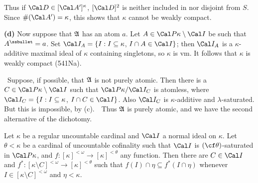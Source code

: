 {Thus if $\Cal D\in[\Cal A']^{\kappa}$, $[\Cal D]^2$ is neither included
in nor disjoint from $S$.   Since $\#(\Cal A')=\kappa$, this shows that
$\kappa$ cannot be weakly compact.\ \Qed

\medskip

{\bf (d)} Now suppose that $\frak A$ has an atom $a$.
Let $A\in\Cal P\kappa\setminus\Cal I$ be such that $A^{\ssbullet}=a$.
Set $\Cal I_A=\{I:I\subseteq\kappa$, $I\cap A\in\Cal I\}$;  then
$\Cal I_A$ is a $\kappa$-additive maximal ideal of $\kappa$ containing
singletons, so $\kappa$ is \2vm.   It follows that $\kappa$ is weakly
compact (541Na).

\Quer\ Suppose, if possible, that $\frak A$ is not purely atomic.   Then
there is a $C\in\Cal P\kappa\setminus\Cal I$ such that
$\Cal P\kappa/\Cal I_C$ is atomless, where
$\Cal I_C=\{I:I\subseteq\kappa$, $I\cap C\in\Cal I\}$.   Also $\Cal I_C$ is
$\kappa$-additive and $\lambda$-saturated.   But this is
impossible, by (c).\ \BanG\  Thus $\frak A$ is purely atomic, and we
have the second alternative of the dichotomy.
}%

Let $\kappa$ be a regular uncountable cardinal and $\Cal I$ a normal
ideal on $\kappa$.   Let $\theta<\kappa$ be a cardinal of uncountable
cofinality such that
$\Cal I$ is $(\cf\theta)$-saturated in $\Cal P\kappa$, and
$f:[\kappa]^{<\omega}\to[\kappa]^{<\theta}$ any
function.   Then there are $C\in\Cal I$ and
$f^*:[\kappa\setminus C]^{<\omega}\to[\kappa]^{<\theta}$ such that
$f(I)\cap\eta\subseteq f^*(I\cap\eta)$ whenever
$I\in[\kappa\setminus C]^{<\omega}$ and $\eta<\kappa$.

